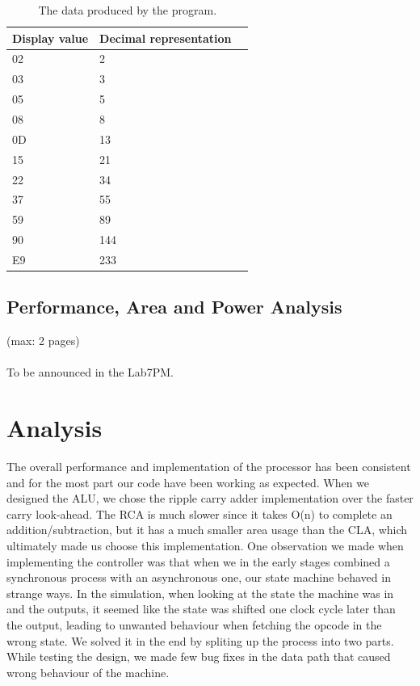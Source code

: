\documentclass[a4,11pt]{article}
\begin{document}
\begin{table}   
	\centering
	\small
	\def\arraystretch{1.1}              
	\begin{tabular}{|l|l|l|}
		\hline
		Display value & Decimal representation \\ \hline
		02  & 2                                \\
    03  & 3                                \\
    05  & 5                                \\
    08  & 8                                \\
    0D  & 13                               \\
    15  & 21                               \\
    22  & 34                               \\
    37  & 55                               \\
    59  & 89                               \\
    90  & 144                              \\    
    E9  & 233                              \\ \hline
	\end{tabular}
	\caption{The data produced by the program.}
	\label{tab:fib_data}
\end{table}

\subsection{Performance, Area and Power Analysis}
(max: 2 pages)
\\\\
To be announced in the Lab7PM.

\section{Analysis}

The overall performance and implementation of the processor has been consistent
and for the most part our code have been working as expected. When we designed
the ALU, we chose the ripple carry adder implementation over the faster carry
look-ahead. The RCA is much slower since it takes O(n) to complete an
addition/subtraction, but it has a much smaller area usage than the CLA, which
ultimately made us choose this implementation. One observation we made when 
implementing the controller was that when we in the early stages combined a
synchronous process with an asynchronous one, our state machine behaved in
strange ways. In the simulation, when looking at the state the machine was in
and the outputs, it seemed like the state was shifted one clock cycle later
than the output, leading to unwanted behaviour when fetching the opcode in
the wrong state. We solved it in the end by spliting up the process into two
parts. While testing the design, we made few bug fixes in the data path that
caused wrong behaviour of the machine.
\end{document}
